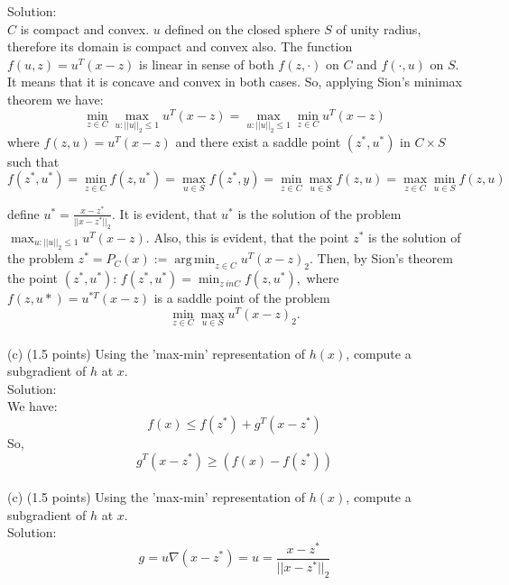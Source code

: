 \documentclass{article}
\begin{document}
Solution: \\
$C$ is compact and convex. $u$ defined on the closed sphere $S$ of unity radius, therefore its domain is compact and convex also. The function $f(u, z) = u^T(x - z)$ is linear 
in sense of both $f(z, \cdot)$ on $C$ and $f(\cdot, u)$ 
on $S.$ It means that it is concave and convex in both cases. So, applying Sion's minimax theorem  we have:\\
$$
\min_{z \in C} \max_{u:||u||_2 \leq 1} u^T(x - z) = 
\max_{u:||u||_2 \leq 1} \min_{z \in C} u^T(x - z)
$$
where ${f(z, u) = u^T(x - z)}$
and there exist a saddle point $(z^*, u^*)$ in $C \times S$
such that 
$$
f(z^*, u^*) = \min_{z \in C} f(z, u^*) = 
\max_{u \in S} f(z^*, y) = \min_{z \in C} \max_{u \in S} f(z, u) = \max_{z \in C} \min_{u \in S}  f(z, u)
$$

define $u^* = \frac{x - z^*}{||x - z^*||_2}.$ It is evident, that $u^*$ is the solution of the problem 
$\max_{u:||u||_2 \leq 1} u^T(x - z).$ Also, this is evident, that the point $z^*$ is the solution of the problem 
${z^* = P_C(x) := \operatorname*{arg\,min}_{z \in C}
	u^T(x - z)_2}.$ 
Then, by Sion's theorem the point 
${(z^*, u^*): \, f(z^*, u^*)} = \min_{z \ in C} f(z, u^*),$
where ${f(z, u*) = u^{*T}(x - z)}$
is a saddle point of the problem 
$$
\min_{z \in C} \max_{u \in S} u^T(x - z)_2.
$$
\\
(c) (1.5 points) Using the 'max-min' representation of $h(x)$, compute a subgradient of $h$ at $x$. \\

Solution: \\

We have:\\
$$
f(x) \leq f(z^*) + g^T (x - z^*)
$$
So, 
$$
g^T (x - z^*) \geq (f(x) - f(z^*))
$$
\\

(c) (1.5 points) Using the 'max-min' representation of $h(x)$, compute a subgradient of $h$ at $x$.
\\

Solution:
$$
g = u \nabla (x - z^*) = u = \frac{x - z^*}{||x - z^*||_2}
$$
\end{document}
